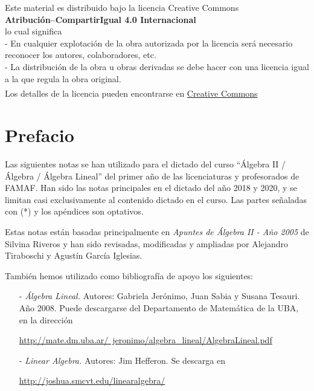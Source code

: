 \documentclass[a4paper,12pt,twoside,spanish,reqno,dottedtoc]{scrbook}
\begin{document}
	${}^{}$\\
	{\flushleft 
		Este material es distribuido bajo la licencia Creative Commons} \\
	{\center \textbf{Atribución--CompartirIgual 4.0 Internacional}}
	\\ 
	\center  lo cual significa 
	\\
	\flushleft
	- En cualquier explotación de la obra autorizada por la licencia será necesario reconocer los autores, colaboradores, etc.\\
	- La distribución de la obra u obras derivadas se debe hacer con una licencia igual a la que regula la obra original.\\
	${}^{}$
	\\
	Los detalles de la licencia pueden encontrarse en \href{https://creativecommons.org/licenses/by/4.0/deed.es}{Creative Commons}
	\vskip 1cm 
	\endgroup

	
	
	 
	\pagestyle{scrheadings} %
	\cleardoublepage %
	\cleardoublepage
	
	
	\chapter*{Prefacio} 
	
	
	Las siguientes notas se han utilizado para el dictado del curso ``Álgebra II / Álgebra / Álgebra Lineal'' del primer año de las licenciaturas y profesorados de FAMAF. 	Han sido las notas principales en el dictado del año 2018 y 2020, y se limitan casi exclusivamente al contenido dictado en el curso. Las partes señaladas con (*) y los apéndices son optativos.
	
	Estas notas están basadas principalmente en \textit{Apuntes de Álgebra II - Año 2005} de Silvina Riveros y han sido revisadas, modificadas y ampliadas por Alejandro Tiraboschi  y Agustín García Iglesias. 
	
	También hemos utilizado como bibliografía de apoyo  los siguientes: 
	
	\begin{enumerate}
		\item [-] \textit{Álgebra Lineal.} Autores: Gabriela Jerónimo, Juan Sabia y Susana Tesauri. Año 2008. Puede descargarse del Departamento de Matemática de la UBA, en la dirección
		
		\href{http://mate.dm.uba.ar/~jeronimo/algebra_lineal/AlgebraLineal.pdf}	 {http://mate.dm.uba.ar/~jeronimo/algebra\_lineal/AlgebraLineal.pdf}
		\item [- ] \textit{Linear Algebra.} Autores: Jim Hefferon. Se descarga en
		
		\href{http://joshua.smcvt.edu/linearalgebra/}{http://joshua.smcvt.edu/linearalgebra/}
	\end{enumerate}
	
\end{document}
